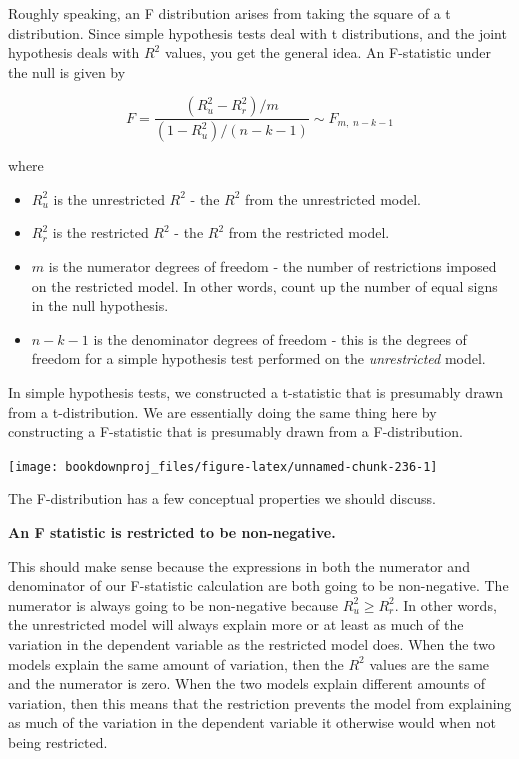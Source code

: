 \documentclass[
]{book}
\begin{document}
Roughly speaking, an F distribution arises from taking the square of a t distribution. Since simple hypothesis tests deal with t distributions, and the joint hypothesis deals with \(R^2\) values, you get the general idea. An F-statistic under the null is given by

\[F=\frac{(R^2_u - R^2_r)/m}{(1-R^2_u)/(n-k-1)} \sim F_{m,\;n-k-1}\]

where

\begin{itemize}
\item
  \(R^2_u\) is the unrestricted \(R^2\) - the \(R^2\) from the unrestricted model.
\item
  \(R^2_r\) is the restricted \(R^2\) - the \(R^2\) from the restricted model.
\item
  \(m\) is the numerator degrees of freedom - the number of restrictions imposed on the restricted model. In other words, count up the number of equal signs in the null hypothesis.
\item
  \(n-k-1\) is the denominator degrees of freedom - this is the degrees of freedom for a simple hypothesis test performed on the \emph{unrestricted} model.
\end{itemize}

In simple hypothesis tests, we constructed a t-statistic that is presumably drawn from a t-distribution. We are essentially doing the same thing here by constructing a F-statistic that is presumably drawn from a F-distribution.

\begin{center}\texttt{[image: bookdownproj\_files/figure-latex/unnamed-chunk-236-1]} \end{center}

The F-distribution has a few conceptual properties we should discuss.

\textbf{An F statistic is restricted to be non-negative.}

This should make sense because the expressions in both the numerator and denominator of our F-statistic calculation are both going to be non-negative. The numerator is always going to be non-negative because \(R^2_u \geq R^2_r\). In other words, the unrestricted model will always explain more or at least as much of the variation in the dependent variable as the restricted model does. When the two models explain the same amount of variation, then the \(R^2\) values are the same and the numerator is zero. When the two models explain different amounts of variation, then this means that the restriction prevents the model from explaining as much of the variation in the dependent variable it otherwise would when not being restricted.
\end{document}

